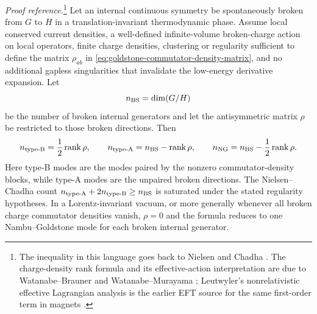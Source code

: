 \begin{quotedtheorem}
\label{qthm:nonlorentz-ng-counting}
\emph{Proof reference.}\footnote{The inequality in this language goes back to
Nielsen and Chadha \cite{NielsenChadha1976GoldstoneCounting}.  The
charge-density rank formula and its effective-action interpretation are due
to Watanabe--Brauner \cite{WatanabeBrauner2011NGBChargeDensity} and
Watanabe--Murayama
\cite{WatanabeMurayama2012UnifiedNGB,WatanabeMurayama2014NonrelativisticEL};
Leutwyler's nonrelativistic effective Lagrangian analysis is the earlier EFT
source for the same first-order term in magnets
\cite{Leutwyler1994NonrelativisticEL}.}
Let an internal continuous symmetry be spontaneously broken from \(G\) to
\(H\) in a translation-invariant thermodynamic phase.  Assume local conserved
current densities, a well-defined infinite-volume broken-charge action on
local operators, finite charge densities, clustering or regularity sufficient
to define the matrix \(\rho_{ab}\) in
\eqref{eq:goldstone-commutator-density-matrix}, and no additional gapless
singularities that invalidate the low-energy derivative expansion.  Let
\[
  n_{\rm BS}=\dim(G/H)
\]
be the number of broken internal generators and let the antisymmetric matrix
\(\rho\) be restricted to those broken directions.  Then
\begin{equation}
  n_{\rm type\text{-}B}
  =
  \frac12\operatorname{rank}\rho,
  \qquad
  n_{\rm type\text{-}A}
  =
  n_{\rm BS}-\operatorname{rank}\rho,
  \qquad
  n_{\rm NG}
  =
  n_{\rm BS}-\frac12\operatorname{rank}\rho .
  \label{eq:watanabe-murayama-counting}
\end{equation}
Here type-B modes are the modes paired by the nonzero commutator-density
blocks, while type-A modes are the unpaired broken directions.  The
Nielsen--Chadha count \(n_{\rm type\text{-}A}+2n_{\rm type\text{-}B}\ge
n_{\rm BS}\) is saturated under the stated regularity hypotheses.  In a
Lorentz-invariant vacuum, or more generally whenever all broken charge
commutator densities vanish, \(\rho=0\) and the formula reduces to one
Nambu--Goldstone mode for each broken internal generator.
\end{quotedtheorem}

